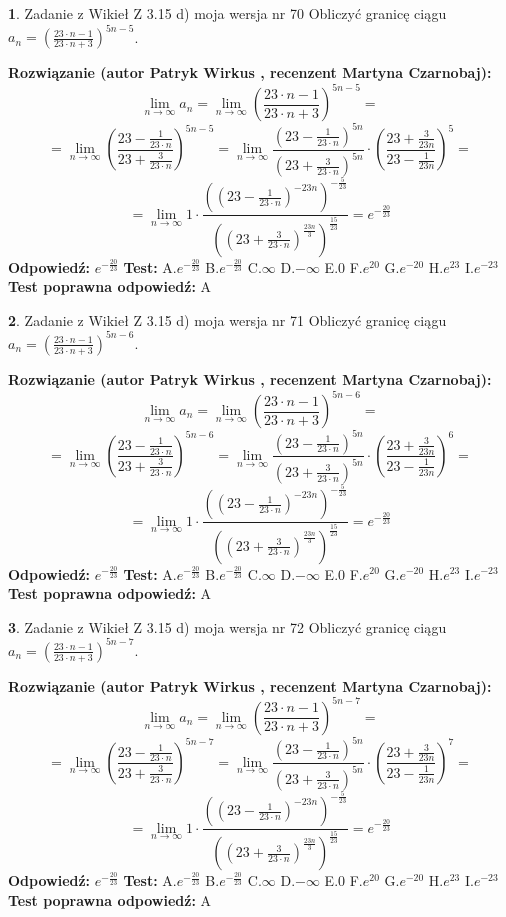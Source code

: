 \documentclass[12pt, a4paper]{article}
\theoremstyle{definition} %
\newtheorem{zad}{}
\newcommand{\zadStart}[1]{\begin{zad}#1\newline}
\newcommand{\zadStop}{\end{zad}}
\newcommand{\rozwStart}[2]{\noindent \textbf{Rozwiązanie (autor #1 , recenzent #2): }\newline}
\newcommand{\rozwStop}{\newline}
\newcommand{\odpStart}{\noindent \textbf{Odpowiedź:}\newline}
\newcommand{\odpStop}{\newline}
\newcommand{\testStart}{\noindent \textbf{Test:}\newline}
\newcommand{\testStop}{\newline}
\newcommand{\kluczStart}{\noindent \textbf{Test poprawna odpowiedź:}\newline}
\newcommand{\kluczStop}{\newline}
\begin{document}
\zadStart{Zadanie z Wikieł Z 3.15 d) moja wersja nr 70}
Obliczyć granicę ciągu $a_{n}=(\frac{23\cdot n - 1}{23 \cdot n + 3})^{5n-5}$.
\zadStop
\rozwStart{Patryk Wirkus}{Martyna Czarnobaj}
$$\lim\limits_{n\to\infty} a_{n} = \lim\limits_{n\to\infty}(\frac{23\cdot n - 1}{23 \cdot n + 3})^{5n-5}=$$
$$=\lim\limits_{n\to\infty}(\frac{23 - \frac{1}{23\cdot n}}{23 + \frac{3}{23 \cdot n}})^{5n-5}=\lim\limits_{n\to\infty}\frac{(23 - \frac{1}{23\cdot n})^{5n}}{(23 + \frac{3}{23\cdot n})^{5n}} \cdot (\frac{23+\frac{3}{23n}}{23-\frac{1}{23n}})^{5}=$$
$$=\lim\limits_{n\to\infty} 1 \cdot \frac{((23-\frac{1}{23 \cdot n})^{-23n})^{-\frac{5}{23}}}{((23+\frac{3}{23 \cdot n})^{\frac{23n}{3}})^{\frac{15}{23}}} =e^{-\frac{20}{23}}$$
\rozwStop
\odpStart
$e^{-\frac{20}{23}}$
\odpStop
\testStart
A.$ e^{-\frac{20}{23}}$
B.$ e^{-\frac{20}{23}}$
C.$\infty$
D.$-\infty$
E.$0$
F.$e^{20}$
G.$e^{-20}$
H.$e^{23}$
I.$e^{-23}$
\testStop
\kluczStart
A
\kluczStop



\zadStart{Zadanie z Wikieł Z 3.15 d) moja wersja nr 71}
Obliczyć granicę ciągu $a_{n}=(\frac{23\cdot n - 1}{23 \cdot n + 3})^{5n-6}$.
\zadStop
\rozwStart{Patryk Wirkus}{Martyna Czarnobaj}
$$\lim\limits_{n\to\infty} a_{n} = \lim\limits_{n\to\infty}(\frac{23\cdot n - 1}{23 \cdot n + 3})^{5n-6}=$$
$$=\lim\limits_{n\to\infty}(\frac{23 - \frac{1}{23\cdot n}}{23 + \frac{3}{23 \cdot n}})^{5n-6}=\lim\limits_{n\to\infty}\frac{(23 - \frac{1}{23\cdot n})^{5n}}{(23 + \frac{3}{23\cdot n})^{5n}} \cdot (\frac{23+\frac{3}{23n}}{23-\frac{1}{23n}})^{6}=$$
$$=\lim\limits_{n\to\infty} 1 \cdot \frac{((23-\frac{1}{23 \cdot n})^{-23n})^{-\frac{5}{23}}}{((23+\frac{3}{23 \cdot n})^{\frac{23n}{3}})^{\frac{15}{23}}} =e^{-\frac{20}{23}}$$
\rozwStop
\odpStart
$e^{-\frac{20}{23}}$
\odpStop
\testStart
A.$ e^{-\frac{20}{23}}$
B.$ e^{-\frac{20}{23}}$
C.$\infty$
D.$-\infty$
E.$0$
F.$e^{20}$
G.$e^{-20}$
H.$e^{23}$
I.$e^{-23}$
\testStop
\kluczStart
A
\kluczStop



\zadStart{Zadanie z Wikieł Z 3.15 d) moja wersja nr 72}
Obliczyć granicę ciągu $a_{n}=(\frac{23\cdot n - 1}{23 \cdot n + 3})^{5n-7}$.
\zadStop
\rozwStart{Patryk Wirkus}{Martyna Czarnobaj}
$$\lim\limits_{n\to\infty} a_{n} = \lim\limits_{n\to\infty}(\frac{23\cdot n - 1}{23 \cdot n + 3})^{5n-7}=$$
$$=\lim\limits_{n\to\infty}(\frac{23 - \frac{1}{23\cdot n}}{23 + \frac{3}{23 \cdot n}})^{5n-7}=\lim\limits_{n\to\infty}\frac{(23 - \frac{1}{23\cdot n})^{5n}}{(23 + \frac{3}{23\cdot n})^{5n}} \cdot (\frac{23+\frac{3}{23n}}{23-\frac{1}{23n}})^{7}=$$
$$=\lim\limits_{n\to\infty} 1 \cdot \frac{((23-\frac{1}{23 \cdot n})^{-23n})^{-\frac{5}{23}}}{((23+\frac{3}{23 \cdot n})^{\frac{23n}{3}})^{\frac{15}{23}}} =e^{-\frac{20}{23}}$$
\rozwStop
\odpStart
$e^{-\frac{20}{23}}$
\odpStop
\testStart
A.$ e^{-\frac{20}{23}}$
B.$ e^{-\frac{20}{23}}$
C.$\infty$
D.$-\infty$
E.$0$
F.$e^{20}$
G.$e^{-20}$
H.$e^{23}$
I.$e^{-23}$
\testStop
\kluczStart
A
\kluczStop
\end{document}
